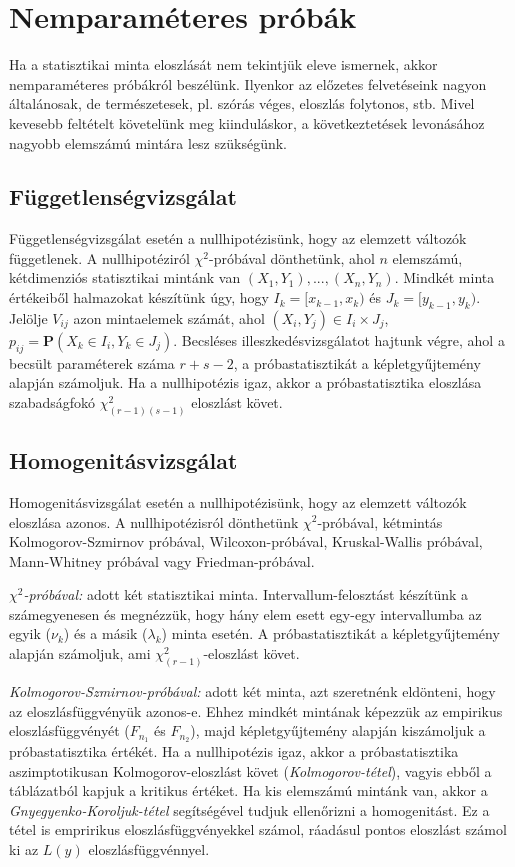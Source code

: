 \chapter{Nemparaméteres próbák}

Ha a statisztikai minta eloszlását nem tekintjük eleve ismernek, akkor nemparaméteres próbákról beszélünk. Ilyenkor az előzetes felvetéseink nagyon általánosak, de természetesek, pl. szórás véges, eloszlás folytonos, stb. Mivel kevesebb feltételt követelünk meg kiinduláskor, a következtetések levonásához nagyobb elemszámú mintára lesz szükségünk.

\section{Függetlenségvizsgálat}

Függetlenségvizsgálat esetén a nullhipotézisünk, hogy az elemzett változók függetlenek. A nullhipotéziról $\chi^2$-próbával dönthetünk, ahol $n$ elemszámú, kétdimenziós statisztikai mintánk van $(X_1,Y_1), ... , (X_n,Y_n)$. Mindkét minta értékeiből halmazokat készítünk úgy, hogy $I_k = [x_{k-1}, x_k)$ és $J_k = [y_{k-1}, y_k)$. Jelölje $V_{ij}$ azon mintaelemek számát, ahol $(X_i,Y_j) \in I_i \times J_j$, $p_{ij} = \mathbf{P}(X_k \in I_i, Y_k \in J_j)$. Becsléses illeszkedésvizsgálatot hajtunk végre, ahol a becsült paraméterek száma $r+s-2$, a próbastatisztikát a képletgyűjtemény alapján számoljuk. Ha a nullhipotézis igaz, akkor a próbastatisztika eloszlása  szabadságfokó $\chi^2_{(r-1)(s-1)}$ eloszlást követ.

\section{Homogenitásvizsgálat}

Homogenitásvizsgálat esetén a nullhipotézisünk, hogy az elemzett változók eloszlása azonos. A nullhipotézisról dönthetünk $\chi^2$-próbával, kétmintás Kolmogorov-Szmirnov próbával, Wilcoxon-próbával, Kruskal-Wallis próbával, Mann-Whitney próbával vagy Friedman-próbával.

\emph{$\chi^2$-próbával:} adott két statisztikai minta. Intervallum-felosztást készítünk a számegyenesen és megnézzük, hogy hány elem esett egy-egy intervallumba az egyik ($\nu_k$) és a másik ($\lambda_k$) minta esetén. A próbastatisztikát a képletgyűjtemény alapján számoljuk, ami $\chi^2_{(r-1)}$-eloszlást követ.

\emph{Kolmogorov-Szmirnov-próbával:} adott két minta, azt szeretnénk eldönteni, hogy az eloszlásfüggvényük azonos-e. Ehhez mindkét mintának képezzük az empirikus eloszlásfüggvényét ($F_{n_1}$ és $F_{n_2}$), majd képletgyűjtemény alapján kiszámoljuk a próbastatisztika értékét. Ha a nullhipotézis igaz, akkor a próbastatisztika aszimptotikusan Kolmogorov-eloszlást követ (\emph{Kolmogorov-tétel}), vagyis ebből a táblázatból kapjuk a kritikus értéket. Ha kis elemszámú mintánk van, akkor a \emph{Gnyegyenko-Koroljuk-tétel} segítségével tudjuk ellenőrizni a homogenitást. Ez a tétel is empririkus eloszlásfüggvényekkel számol, ráadásul pontos eloszlást számol ki az $L(y)$ eloszlásfüggvénnyel.

